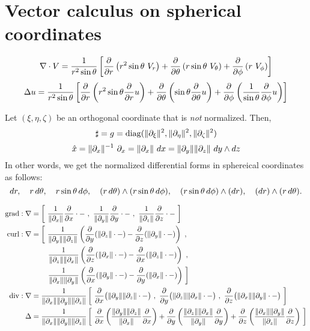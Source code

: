 \documentclass[11pt]{article}
\let\realsection\section
\renewcommand\section{\newpage\realsection}
\begin{document}
\section{Vector calculus on spherical coordinates}


\[
\del\cdot V=\frac1{r^2\sin\theta}\left[  \pd{r}\left(r^2\sin\theta\ V_r\right) + \pd{\theta}\left(r\sin\theta\ V_\theta\right) + \pd{\phi}\left(r\ V_\phi\right)  \right]
\]
\[\Delta u=\frac1{r^2\sin\theta}\left[\pd{r}\left(r^2\sin\theta\pd{r}u\right)+\pd{\theta}\left(\sin\theta\pd{\theta}u\right)+\pd{\phi}\left(\frac1{\sin\theta}\pd{\phi}u\right)\right]\]

Let $(\xi,\eta,\zeta)$ be an orthogonal coordinate that is \emph{not} normalized.
Then,
\[\sharp=g=\diag(\|\pd_\xi\|^2,\|\pd_\eta\|^2,\|\pd_\zeta\|^2)\]
\[\hat x=\|\pd_x\|^{-1}\ \pd_x=\|\pd_x\|\ dx=\|\pd_y\|\|\pd_z\|\ dy\wdg dz\]
In other words, we get the normalized differential forms in sphereical coordinates as follows:
\[dr,\quad r\,d\theta,\quad r\sin\theta\,d\phi,\quad(r\,d\theta)\wedge(r\sin\theta\,d\phi),\quad(r\sin\theta\,d\phi)\wedge(dr),\quad(dr)\wedge(r\,d\theta).\]

\begin{align*}
\grad:\del&=\left[\ \frac1{\|\pd_x\|}\pd{x}\cdot-\ ,\ \frac1{\|\pd_y\|}\pd{y}\cdot-\ ,\ \frac1{\|\pd_z\|}\pd{z}\cdot-\ \right]\\
\curl:\del&=\left[\ \frac1{\|\pd_y\|\|\pd_z\|}\left(\pd{y}(\|\pd_z\|\cdot-)-\pd{z}(\|\pd_y\|\cdot-)\right)\ ,\right.\\
&\qquad\left.\frac1{\|\pd_z\|\|\pd_x\|}\left(\pd{z}(\|\pd_x\|\cdot-)-\pd{x}(\|\pd_z\|\cdot-)\right)\ ,\right.\\
&\qquad\left.\frac1{\|\pd_x\|\|\pd_y\|}\left(\pd{x}(\|\pd_y\|\cdot-)-\pd{y}(\|\pd_x\|\cdot-)\right)\ \right]\\
\div:\del&=\frac1{\|\pd_x\|\|\pd_y\|\|\pd_z\|}\left[\ \pd{x}\bigl(\|\pd_y\|\|\pd_z\|\cdot-\bigr)\ ,\ \pd{y}\bigl(\|\pd_z\|\|\pd_x\|\cdot-\bigr)\ ,\ \pd{z}\bigl(\|\pd_x\|\|\pd_y\|\cdot-\bigr)\ \right]\\
\Delta&=\frac1{\|\pd_x\|\|\pd_y\|\|\pd_z\|}\left[\ \pd{x}\left(\frac{\|\pd_y\|\|\pd_z\|}{\|\pd_x\|}\pd{x}\right)+\pd{y}\left(\frac{\|\pd_z\|\|\pd_x\|}{\|\pd_y\|}\pd{y}\right)+\pd{z}\left(\frac{\|\pd_x\|\|\pd_y\|}{\|\pd_z\|}\pd{z}\right)\ \right]
\end{align*}
\end{document}
